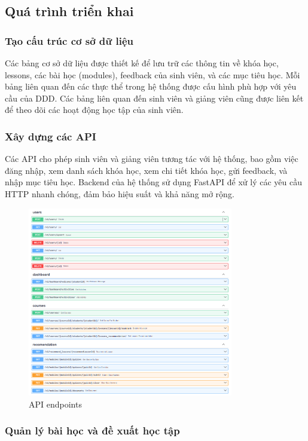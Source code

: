 \subsection{Quá trình triển khai}

\subsubsection{Tạo cấu trúc cơ sở dữ liệu}

Các bảng cơ sở dữ liệu được thiết kế để lưu trữ các thông tin về khóa học, lessons, các bài học (modules), feedback của sinh viên, và các mục tiêu học. Mỗi bảng liên quan đến các thực thể trong hệ thống được cấu hình phù hợp với yêu cầu của DDD. Các bảng liên quan đến sinh viên và giảng viên cũng được liên kết để theo dõi các hoạt động học tập của sinh viên.

\subsubsection{Xây dựng các API}

Các API cho phép sinh viên và giảng viên tương tác với hệ thống, bao gồm việc đăng nhập, xem danh sách khóa học, xem chi tiết khóa học, gửi feedback, và nhập mục tiêu học. Backend của hệ thống sử dụng FastAPI để xử lý các yêu cầu HTTP nhanh chóng, đảm bảo hiệu suất và khả năng mở rộng.

\begin{figure}[H]
    \centering
    \includegraphics[width=0.8\textwidth]{Images/Implement/APIs.png}
    \caption{API endpoints}
\end{figure}
\subsubsection{Quản lý bài học và đề xuất học tập}

